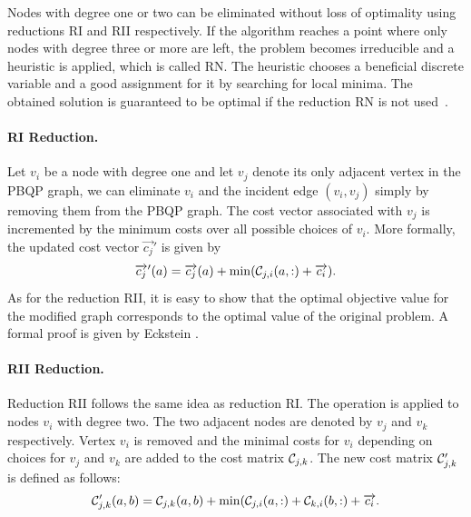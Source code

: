 Nodes with degree one or two can be eliminated without loss of
optimality using reductions RI and RII respectively. If the algorithm
reaches a point where only nodes with degree three or more are left,
the problem becomes irreducible and a heuristic is applied, which is
called RN. The heuristic chooses a beneficial discrete variable and a
good assignment for it by searching for local minima. The obtained
solution is guaranteed to be optimal if the reduction RN is not
used~\cite{Eck03}.

\paragraph{RI Reduction.}
Let $v_i$ be a node with degree one and let $v_j$ denote its only
adjacent vertex in the PBQP graph, we can eliminate $v_i$ and the
incident edge $(v_i, v_j)$ simply by removing them from the PBQP
graph. The cost vector associated with $v_j$ is incremented by the
minimum costs over all possible choices of $v_i$. More formally, the
updated cost vector $\vec{c_j}'$ is given by
$$\overrightarrow{c_j}'(a) = \overrightarrow{c_j}(a) + \min({\mathcal C}_{j,i}(a,:) +
\overrightarrow{c_i}).$$ As for the reduction RII, it is easy to show that the
optimal objective value for the modified graph corresponds to the
optimal value of the original problem. A formal proof is given by
Eckstein \cite{Eck03}.

\paragraph{RII Reduction.}
Reduction RII follows the same idea as reduction RI. The operation is
applied to nodes $v_i$ with degree two. The two adjacent nodes are
denoted by $v_j$ and $v_k$ respectively. Vertex $v_i$ is removed and
the minimal costs for $v_i$ depending on choices for $v_j$ and $v_k$
are added to the cost matrix ${\mathcal C}_{j,k}$. The new cost
matrix ${\mathcal C}'_{j,k}$ is defined as follows:
$${\mathcal C}'_{j,k}(a,b) = {\mathcal C}_{j,k}(a,b) +
\min({\mathcal C}_{j,i}(a,:) + {\mathcal C}_{k,i}(b,:) + \overrightarrow{c_i}.$$

